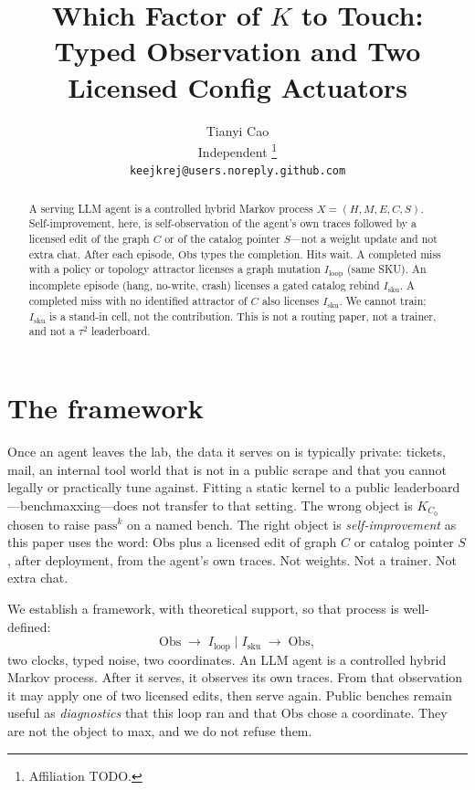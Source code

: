 \documentclass{article}
\title{Which Factor of {$K$} to Touch: Typed Observation and Two Licensed Config Actuators}
\author{Tianyi Cao \\
Independent \thanks{Affiliation TODO.} \\
\texttt{keejkrej@users.noreply.github.com}
}
\begin{document}
\maketitle

\begin{abstract}
A serving LLM agent is a controlled hybrid Markov process \(X=(H,M,E,C,S)\). Self-improvement, here, is self-observation of the agent's own traces followed by a licensed edit of the graph \(C\) or of the catalog pointer \(S\)---not a weight update and not extra chat. After each episode, \(\mathrm{Obs}\) types the completion. Hits wait. A completed miss with a policy or topology attractor licenses a graph mutation \(I_{\mathrm{loop}}\) (same SKU). An incomplete episode (hang, no-write, crash) licenses a gated catalog rebind \(I_{\mathrm{sku}}\). A completed miss with no identified attractor of \(C\) also licenses \(I_{\mathrm{sku}}\). We cannot train; \(I_{\mathrm{sku}}\) is a stand-in cell, not the contribution. This is not a routing paper, not a trainer, and not a \(\tau^2\) leaderboard.
\end{abstract}

\section{The framework}
\label{sec:claim}

Once an agent leaves the lab, the data it serves on is typically private: tickets, mail, an internal tool world that is not in a public scrape and that you cannot legally or practically tune against. Fitting a static kernel to a public leaderboard---benchmaxxing---does not transfer to that setting. The wrong object is \(K_{C_0}\) chosen to raise \(\mathrm{pass}^k\) on a named bench. The right object is \emph{self-improvement} as this paper uses the word: \(\mathrm{Obs}\) plus a licensed edit of graph \(C\) or catalog pointer \(S\), after deployment, from the agent's own traces. Not weights. Not a trainer. Not extra chat.

We establish a framework, with theoretical support, so that process is well-defined:
\[
\mathrm{Obs}\;\to\; I_{\mathrm{loop}}\mid I_{\mathrm{sku}}\;\to\;\mathrm{Obs},
\]
two clocks, typed noise, two coordinates. An LLM agent is a controlled hybrid Markov process. After it serves, it observes its own traces. From that observation it may apply one of two licensed edits, then serve again. Public benches remain useful as \emph{diagnostics} that this loop ran and that \(\mathrm{Obs}\) chose a coordinate. They are not the object to max, and we do not refuse them.
\end{document}

